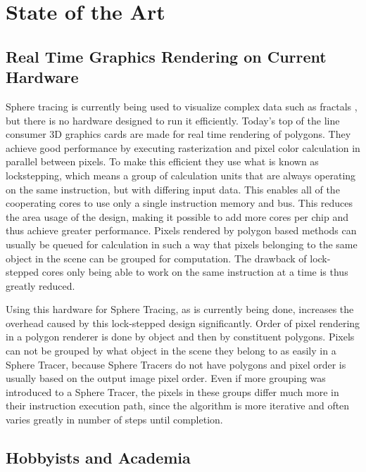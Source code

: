 \chapter{State of the Art}

	\section{ Real Time Graphics Rendering on Current Hardware } 

		Sphere tracing is currently being used to visualize complex data such
		as fractals \cite{TODO}, but there is no hardware designed to run it
		efficiently.  Today's top of the line consumer 3D graphics cards are
		made for real time rendering of polygons. They achieve good performance
		by executing rasterization and pixel color calculation in parallel
		between pixels. To make this efficient they use what is known as
		lockstepping, which means a group of calculation units that are always
		operating on the same instruction, but with differing input data. This
		enables all of the cooperating cores to use only a single instruction
		memory and bus. This reduces the area usage of the design, making it
		possible to add more cores per chip and thus achieve greater
		performance. Pixels rendered by polygon based methods can usually be
		queued for calculation in such a way that pixels belonging to the same
		object in the scene can be grouped for computation. The drawback of
		lock-stepped cores only being able to work on the same instruction at a
		time is thus greatly reduced.
		
		Using this hardware for Sphere Tracing, as is currently being done,
		increases the overhead caused by this lock-stepped design significantly. 
		Order of pixel rendering in a polygon renderer is done by object and 
		then by constituent polygons. Pixels can not be grouped by what object 
		in the scene they belong to as easily in a Sphere Tracer, because 
		Sphere Tracers do not have polygons and pixel order is usually based on 
		the output image pixel order. Even if more grouping was introduced to a 
		Sphere Tracer, the pixels in these groups differ much more in their 
		instruction execution path, since the algorithm is more iterative and 
		often varies greatly in number of steps until completion.
		
		\section{ Hobbyists and Academia }

